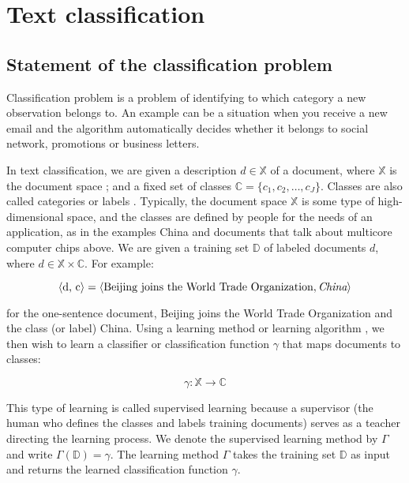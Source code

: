 \chapter{Text classification} \label{chapt1}


\section{Statement of the classification problem} \label{sect1_2}


Classification problem is a problem of identifying to which category a new observation belongs to. An example can be a situation when you receive a new email and the algorithm automatically decides whether it belongs to social network, promotions or business letters.


\newcommand{\docsetlabeled}{\mathbb{D}}

In text classification, we are given a description  $d \in \mathbb{X}$ of a document, where $\mathbb{X}$ is the document space ; and a fixed set of classes  $\mathbb{C} = \{ c_1,c_2,\ldots,c_J \}$. Classes are also called categories or labels . Typically, the document space  $\mathbb{X}$ is some type of high-dimensional space, and the classes are defined by people for the needs of an application, as in the examples China and documents that talk about multicore computer chips above. We are given a training set  $\docsetlabeled$ of labeled documents  $d $, where  $d \in \mathbb{X} \times \mathbb{C}$. For example: 

\begin{equation}
\label{eq:equation3}
\langle\mbox{d, c}\rangle=\langle\mbox{Beijing joins the World Trade Organization}, \emph{China}\rangle
\end{equation}

for the one-sentence document, Beijing joins the World Trade Organization and the class (or label) China.
Using a learning method or learning algorithm , we then wish to learn a classifier or classification function  $\gamma $ that maps documents to classes:

\begin{equation}
\label{eq:equation4}
\gamma: \mathbb{X} \rightarrow \mathbb{C}
\end{equation}

This type of learning is called supervised learning because a supervisor (the human who defines the classes and labels training documents) serves as a teacher directing the learning process. We denote the supervised learning method by $\Gamma$ and write  $\Gamma(\docsetlabeled) = \gamma$. The learning method $\Gamma$ takes the training set  $\docsetlabeled$ as input and returns the learned classification function $\gamma $.

